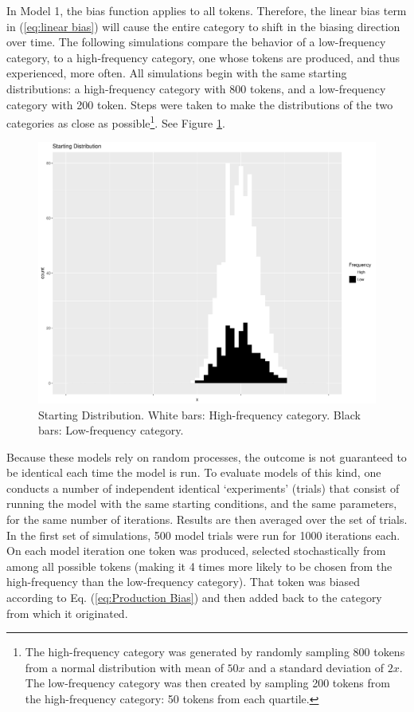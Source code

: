 In Model 1, the bias function applies to all tokens. Therefore, the
linear bias term in (\ref{eq:linear bias}) will cause the entire
category to shift in the biasing direction over time. The following
simulations compare the behavior of a low-frequency category, to a
high-frequency category, one whose tokens are produced, and thus experienced,
more often. All simulations begin with the same starting distributions:
a high-frequency category with 800 tokens, and a low-frequency category
with 200 token. Steps were taken to make the distributions of the
two categories as close as possible\footnote{The high-frequency category was generated by randomly sampling 800
tokens from a normal distribution with mean of $50x$ and a standard
deviation of $2x$. The low-frequency category was then created by
sampling 200 tokens from the high-frequency category: 50 tokens from
each quartile.}. See Figure \ref{fig:Frequency Starting Dist}. 

\begin{figure}[H]

\centering{}\includegraphics[scale=0.3]{figures/startCon.pdf}\caption{\label{fig:Frequency Starting Dist}Starting Distribution. White bars:
High-frequency category. Black bars: Low-frequency category. }
\end{figure}

Because these models rely on random processes, the outcome is not
guaranteed to be identical each time the model is run. To evaluate
models of this kind, one conducts a number of independent identical
`experiments' (trials) that consist of running the model with the
same starting conditions, and the same parameters, for the same number
of iterations. Results are then averaged over the set of trials. In
the first set of simulations, 500 model trials were run for 1000 iterations
each. On each model iteration one token was produced, selected stochastically
from among all possible tokens (making it 4 times more likely to be
chosen from the high-frequency than the low-frequency category). That
token was biased according to Eq. (\ref{eq:Production Bias}) and
then added back to the category from which it originated. 

